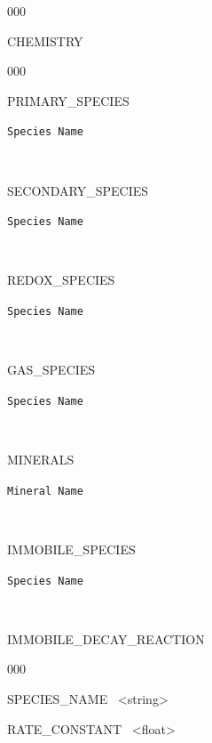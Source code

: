 \begin{deflist}{000}
\item [CHEMISTRY] ~

\begin{deflist}{000}

\item [PRIMARY\_SPECIES] ~
\item {\tt Species Name}
\item [\keyend]

~\\

\item [SECONDARY\_SPECIES] ~
\item {\tt Species Name}
\item [\keyend]

~\\

\item [REDOX\_SPECIES] ~
\item {\tt Species Name}
\item [\keyend]

~\\

\item[GAS\_SPECIES] ~
\item {\tt Species Name}
\item [\keyend]

~\\

\item[MINERALS]
\item {\tt Mineral Name}
\item [\keyend]

~\\

\item[IMMOBILE\_SPECIES]
\item {\tt Species Name}
\item [\keyend]

~\\

\item[IMMOBILE\_DECAY\_REACTION] ~
\begin{deflist}{000}
\item SPECIES\_NAME \ <string>
\item RATE\_CONSTANT \ <float>
\end{deflist}

\item [\keyend]


\end{deflist}
\end{deflist}
